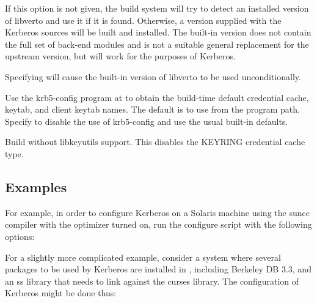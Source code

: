 \documentclass[letterpaper,10pt,english]{sphinxmanual}
\begin{document}
\begin{description}
If this option is not given, the build system will try to detect
an installed version of libverto and use it if it is found.
Otherwise, a version supplied with the Kerberos sources will be
built and installed.  The built-in version does not contain the
full set of back-end modules and is not a suitable general
replacement for the upstream version, but will work for the
purposes of Kerberos.

Specifying \sphinxstylestrong{-} will cause the built-in
version of libverto to be used unconditionally.

\item[{\sphinxstylestrong{-}\sphinxstylestrong{-with-krb5-config=}\sphinxstyleemphasis{PATH}}] \leavevmode
Use the krb5-config program at  to obtain the build-time
default credential cache, keytab, and client keytab names.  The
default is to use  from the program path.  Specify
 to disable the use of krb5-config and
use the usual built-in defaults.

\item[{\sphinxstylestrong{-}\sphinxstylestrong{-without-keyutils}}] \leavevmode
Build without libkeyutils support.  This disables the KEYRING
credential cache type.

\end{description}


\subsection{Examples}
\label{\detokenize{build/options2configure:examples}}
For example, in order to configure Kerberos on a Solaris machine using
the suncc compiler with the optimizer turned on, run the configure
script with the following options:

%
\begin{sphinxVerbatim}[commandchars=\\\{\}]
   
\end{sphinxVerbatim}

For a slightly more complicated example, consider a system where
several packages to be used by Kerberos are installed in
, including Berkeley DB 3.3, and an ss library that
needs to link against the curses library.  The configuration of
Kerberos might be done thus:
\end{document}
